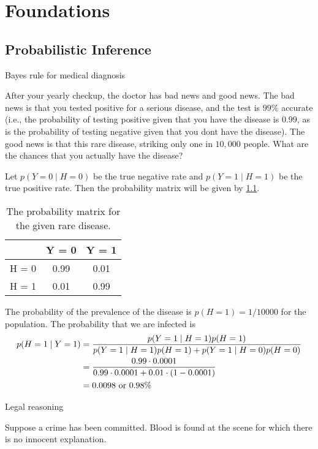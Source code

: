 \part{Foundations}

\chapter{Probabilistic Inference}

\begin{exercise}
\item Bayes rule for medical diagnosis
	\par\smallskip
	After your yearly checkup, the doctor has bad news and good news. The bad news is that you tested
	positive for a serious disease, and the test is \(99\%\) accurate (i.e., the probability of testing positive
	given that you have the disease is \(0.99\), as is the probability of testing negative given that you dont
	have the disease). The good news is that this rare disease, striking only one in \(10,000\) people.
	What are the chances that you actually have the disease?
	\par\smallskip
	Let \(p(Y = 0\mid H = 0)\) be the true negative rate and \(p(Y = 1\mid H = 1)\) be the true positive rate.
	Then the probability matrix will be given by \cref{ch1_ex1}.
	\begin{table}
	\centering
		\begin{tabular}{l | c c}
			& Y = 0 & Y = 1\\ \hline
			H = 0 & 0.99 & 0.01\\
			H = 1 & 0.01 & 0.99
		\end{tabular}
		\caption{The probability matrix for the given rare disease.}
		\label{ch1_ex1}
	\end{table}
	The probability of the prevalence of the disease is \(p(H = 1) = 1 / 10000\) for the population. The 
	probability that we are infected is
	\begin{align}
		p(H = 1\mid Y = 1) 
		&= \frac{p(Y = 1\mid H = 1) p(H = 1)}{p(Y = 1\mid H = 1) p(H = 1) + p(Y = 1\mid H = 0) p(H = 0)}
		\notag\\
		&= \frac{0.99\cdot 0.0001}{0.99\cdot 0.0001 + 0.01 \cdot (1 - 0.0001)}\notag\\
		&= 0.0098\text{ or } 0.98\%\notag
	\end{align}
\item Legal reasoning
	\par\smallskip
	Suppose a crime has been committed. Blood is found at the scene for which there is no innocent explanation.

\end{exercise}
